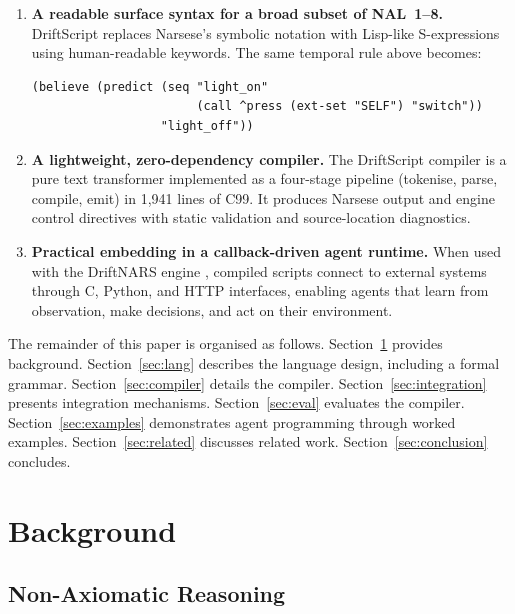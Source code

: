 \documentclass[11pt,a4paper]{article}
\begin{document}
\begin{enumerate}
\item \textbf{A readable surface syntax for a broad subset of NAL~1--8.}
  DriftScript replaces Narsese's symbolic notation with Lisp-like
  S-expressions using human-readable keywords. The same temporal rule above
  becomes:

\begin{lstlisting}[language=DriftScript]
(believe (predict (seq "light_on"
                       (call ^press (ext-set "SELF") "switch"))
                  "light_off"))
\end{lstlisting}

\item \textbf{A lightweight, zero-dependency compiler.} The DriftScript
  compiler is a pure text transformer implemented as a four-stage pipeline
  (tokenise, parse, compile, emit) in 1{,}941 lines of C99. It produces
  Narsese output and engine control directives with static validation and
  source-location diagnostics.

\item \textbf{Practical embedding in a callback-driven agent runtime.} When
  used with the DriftNARS engine \citep{brady2024driftnars}, compiled scripts
  connect to external systems through C, Python, and HTTP interfaces, enabling
  agents that learn from observation, make decisions, and act on their
  environment.
\end{enumerate}

The remainder of this paper is organised as follows. Section~\ref{sec:bg}
provides background. Section~\ref{sec:lang} describes the language design,
including a formal grammar. Section~\ref{sec:compiler} details the compiler.
Section~\ref{sec:integration} presents integration mechanisms.
Section~\ref{sec:eval} evaluates the compiler.
Section~\ref{sec:examples} demonstrates agent programming through worked
examples. Section~\ref{sec:related} discusses related work.
Section~\ref{sec:conclusion} concludes.

\section{Background}
\label{sec:bg}

\subsection{Non-Axiomatic Reasoning}
\end{document}

